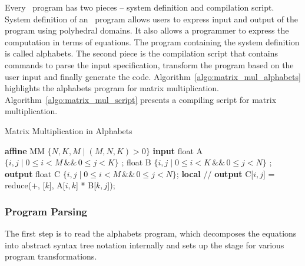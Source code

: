 Every  \alfa\ program has two pieces – system definition and compilation script.  System definition of an  \alfa\ program allows users to express input and output of the program using polyhedral domains. 
It also allows a programmer to express the computation in terms of equations. The program containing the system definition is called alphabets. The second piece is the compilation script that contains commands to parse the input specification, transform the program based on the user input and finally generate the code. Algorithm~\ref{algo:matrix_mul_alphabets} highlights the alphabets program for matrix multiplication. Algorithm~\ref{algo:matrix_mul_script} presents a compiling script for matrix multiplication.
\begin{algorithm}
\caption{Matrix Multiplication in Alphabets}
\begin{algorithmic} [1]
\STATE \textbf{affine} MM $\lbrace N,K,M \mid (M, N, K)  > 0  \rbrace$
\STATE \textbf{input}
\STATE  \hspace{10pt} float A $\lbrace i, j \mid 0 \leq i < M \hspace{2pt} \&\& \hspace{2pt} 0 \leq j < K   \rbrace$ ;
\STATE  \hspace{10pt} float B $\lbrace i, j \mid 0 \leq i < K \hspace{2pt} \&\& \hspace{2pt} 0 \leq j < N   \rbrace$ ;
\STATE \textbf{output}
\STATE  \hspace{10pt} float C $\lbrace i, j \mid 0 \leq i < M \hspace{2pt} \&\& \hspace{2pt} 0 \leq j < N   \rbrace$;
\STATE \textbf{local}
\STATE \hspace{10pt} \slash \slash {}
\STATE \textbf{output}
\STATE \hspace{10pt} C[$i,j$] = reduce(+, \hspace{2pt} [$k$], \hspace{2pt} A[$i,k$] * B[$k,j$]);
\end{algorithmic}
\label{algo:matrix_mul_alphabets}
\end{algorithm}
\subsubsection{Program Parsing}
The first step is to read the alphabets program, which decomposes the equations into abstract syntax tree notation internally and sets up the stage for various program transformations.
